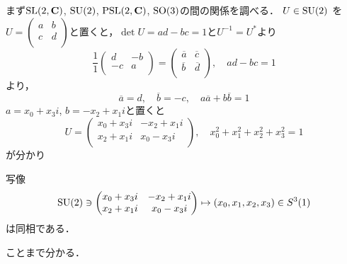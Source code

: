 まず$\operatorname{SL}(2,\mathbf C)$, $\operatorname{SU}(2)$,  $\operatorname{PSL}(2,\mathbf C)$, $\operatorname{SO}(3)$の間の関係を調べる．
$U\in \operatorname{SU}(2)$ を 
$U=\begin{pmatrix}
   a &b\\
   c& d\\
\end{pmatrix}$と置くと，$\det U=ad-bc=1$と$U^{-1}=U^{*}$より
\[
   \frac{1}{1}
   \begin{pmatrix}
      d &-b\\
      -c& a\\
   \end{pmatrix}
   =
   \begin{pmatrix}
      \overline{a} & \overline{c}\\
       \overline{b}&  \overline{d}\\
   \end{pmatrix}, 
   \quad
   ad-bc=1
\]
より，
\[
   \overline{a} =d, \quad \overline{b}=-c, \quad a\overline{a}+b\overline{b}=1
\]
$a=x_0 + x_3i$, $b=-x_2 + x_1i$と置くと
\begin{equation}\label{quaternion}
   U
   =
   \begin{pmatrix}
      x_0 + x_3i &-x_2 + x_1i\\
      x_2 + x_1i& x_0 - x_3i\\
   \end{pmatrix},
   \quad
   x_0^2+x_1^2+x_2^2+x_3^2=1
\end{equation}
が分かり
\begin{Prop}
写像
\[
   \operatorname{SU}(2) \ni  
   \begin{pmatrix}
      x_0 + x_3i &-x_2 + x_1i\\
      x_2 + x_1i& x_0 - x_3i\\
   \end{pmatrix}
   \mapsto 
   ( x_0 , x_1, x_2 ,  x_3)\in  S^3(1)
\]
は同相である．
\end{Prop}
\noindent
ことまで分かる．

